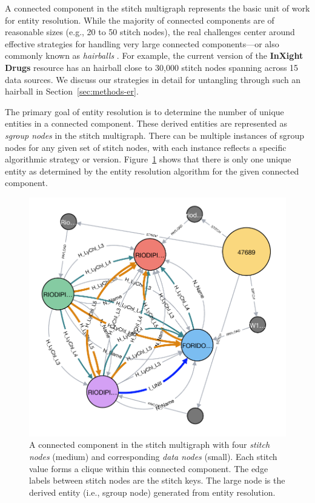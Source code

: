 \documentclass{bioinfo}
\newcommand\ix{\textbf{InXight Drugs}}
\begin{document}
A connected component in the stitch multigraph represents the basic unit of work for entity resolution. While the majority of connected components are of reasonable sizes (e.g., 20 to 50 stitch nodes), the real challenges center around effective strategies for handling very large connected components---or also commonly known as \emph{hairballs} \citep{Croset2015}. For example, the current version of the \ix{} resource has an hairball close to 30,000 stitch nodes spanning across 15 data sources. We discuss our strategies in detail for untangling through such an hairball in Section~\ref{sec:methods-er}.

The primary goal of entity resolution is to determine the number of unique entities in a connected component. These derived entities are represented as \emph{sgroup nodes} in the stitch multigraph. There can be multiple instances of sgroup nodes for any given set of stitch nodes, with each instance reflects a specific algorithmic strategy or version. Figure~\ref{fig:graph1} shows that there is only one unique entity as determined by the entity resolution algorithm for the given connected component.

\begin{figure}[!tpb]
\centerline{\includegraphics[scale=0.5]{graph3}}
\caption{A connected component in the stitch multigraph with four \emph{stitch nodes} (medium) and corresponding \emph{data nodes} (small). Each stitch value forms a clique within this connected component. The edge labels between stitch nodes are the stitch keys. The large node is the derived entity (i.e., sgroup node) generated from entity resolution.}\label{fig:graph1}
\end{figure}
\end{document}

